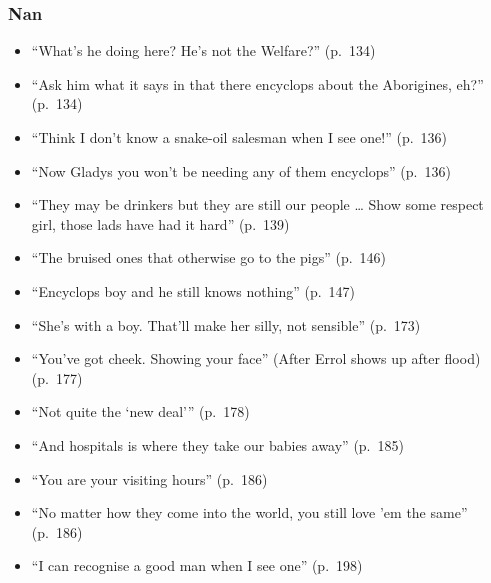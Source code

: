 \documentclass[a4paper]{article}
\begin{document}
\subsubsection{Nan}
\begin{itemize}
    \item ``What’s he doing here? He’s not the Welfare?'' (p.~134)
    \item ``Ask him what it says in that there encyclops about the Aborigines, eh?'' (p.~134)
    \item ``Think I don’t know a snake-oil salesman when I see one!'' (p.~136)
    \item ``Now Gladys you won’t be needing any of them encyclops'' (p.~136)
    \item ``They may be drinkers but they are still our people … Show some respect girl, those lads have had it hard'' (p.~139)
    \item ``The bruised ones that otherwise go to the pigs'' (p.~146)
    \item ``Encyclops boy and he still knows nothing'' (p.~147)
    \item ``She’s with a boy. That’ll make her silly, not sensible'' (p.~173)
    \item ``You’ve got cheek. Showing your face'' (After Errol shows up after flood) (p.~177)
    \item ``Not quite the ‘new deal’'' (p.~178)
    \item ``And hospitals is where they take our babies away'' (p.~185)
    \item ``You are your visiting hours'' (p.~186)
    \item ``No matter how they come into the world, you still love ’em the same'' (p.~186)
    \item ``I can recognise a good man when I see one'' (p.~198)
\end{itemize}
\end{document}
